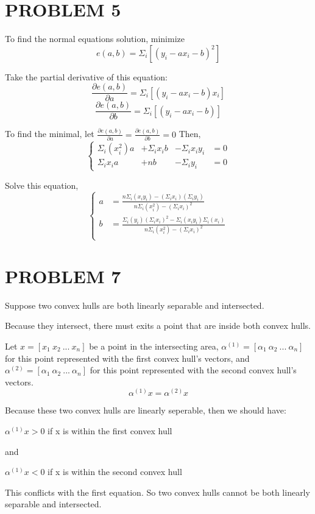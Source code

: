 \documentclass{article}
\begin{document}
	\section{PROBLEM 5}
		To find the normal equations solution, minimize $$e(a,b) = \Sigma_i\left[(y_i - ax_i - b)^2\right]$$\par
		Take the partial derivative of this equation:
			$$\frac{\partial e(a,b)}{\partial a} = \Sigma_i\left[(y_i - ax_i - b)x_i\right]$$
			$$\frac{\partial e(a,b)}{\partial b} = \Sigma_i\left[(y_i - ax_i - b)\right]$$\par
		To find the minimal, let $\frac{\partial e(a,b)}{\partial a} = \frac{\partial e(a,b)}{\partial b} = 0$
		Then, 
		\begin{equation*}
		\left\{
			\begin{aligned}			
			\Sigma_i (x_i^2) a &+ \Sigma_i x_i b &- \Sigma_i x_iy_i &= 0\\
			\Sigma_i x_i a     &+ n b            &- \Sigma_i y_i    &= 0
			\end{aligned}
		\right.
		\end{equation*}\par
		Solve this equation,
		\begin{equation*}
		\left\{
			\begin{aligned}			
			a &= \frac{n\Sigma_i(x_iy_i) - (\Sigma_i x_i) (\Sigma_i y_i)}{n\Sigma_i (x_i^2) - (\Sigma_i x_i)^2}\\
			b &= \frac{\Sigma_i(y_i)(\Sigma_ix_i)^2 - \Sigma_i(x_iy_i)\Sigma_i(x_i)}{n\Sigma_i (x_i^2) - (\Sigma_i x_i)^2}\\
			\end{aligned}
		\right.
		\end{equation*}\par


	\section{PROBLEM 7}
		Suppose two convex hulls are both linearly separable and intersected.\par
		Because they intersect, there must exits a point that are inside both convex hulls.\par
		
		Let  $x = [x_1\ x_2\ ...\ x_n]$ be a point in the intersecting area, $\alpha^{(1)} = [\alpha_1\ \alpha_2\ ...\ \alpha_n]$ for this point represented with the first convex hull's vectors, and $\alpha^{(2)} = [\alpha_1\ \alpha_2\ ...\ \alpha_n]$ for this point represented with the second convex hull's vectors.
		$$\alpha^{(1)}x = \alpha^{(2)}x$$\par
		Because these two convex hulls are linearly seperable, then we should have:\par
		$\alpha^{(1)}x > 0$ if x is within the first convex hull\par
		and\par
		$\alpha^{(1)}x < 0$ if x is within the second convex hull\par
		This conflicts with the first equation. So two convex hulls cannot be both linearly separable and intersected.
\end{document}
